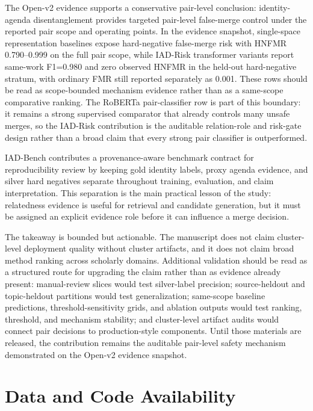 \documentclass[preprint,12pt]{elsarticle}
\begin{document}
The Open-v2 evidence supports a conservative pair-level conclusion: identity-agenda disentanglement provides targeted pair-level false-merge control under the reported pair scope and operating points. In the evidence snapshot, single-space representation baselines expose hard-negative false-merge risk with HNFMR 0.790--0.999 on the full pair scope, while IAD-Risk transformer variants report same-work F1=0.980 and zero observed HNFMR in the held-out hard-negative stratum, with ordinary FMR still reported separately as 0.001. These rows should be read as scope-bounded mechanism evidence rather than as a same-scope comparative ranking. The RoBERTa pair-classifier row is part of this boundary: it remains a strong supervised comparator that already controls many unsafe merges, so the IAD-Risk contribution is the auditable relation-role and risk-gate design rather than a broad claim that every strong pair classifier is outperformed.

IAD-Bench contributes a provenance-aware benchmark contract for reproducibility review by keeping gold identity labels, proxy agenda evidence, and silver hard negatives separate throughout training, evaluation, and claim interpretation. This separation is the main practical lesson of the study: relatedness evidence is useful for retrieval and candidate generation, but it must be assigned an explicit evidence role before it can influence a merge decision.

The takeaway is bounded but actionable. The manuscript does not claim cluster-level deployment quality without cluster artifacts, and it does not claim broad method ranking across scholarly domains. Additional validation should be read as a structured route for upgrading the claim rather than as evidence already present: manual-review slices would test silver-label precision; source-heldout and topic-heldout partitions would test generalization; same-scope baseline predictions, threshold-sensitivity grids, and ablation outputs would test ranking, threshold, and mechanism stability; and cluster-level artifact audits would connect pair decisions to production-style components. Until those materials are released, the contribution remains the auditable pair-level safety mechanism demonstrated on the Open-v2 evidence snapshot.

\section*{Data and Code Availability}
\end{document}
